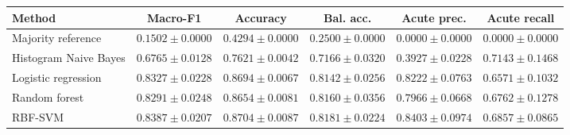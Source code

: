 \begin{tabular}{lccccc}
\toprule
Method & Macro-F1 & Accuracy & Bal. acc. & Acute prec. & Acute recall \\
\midrule
Majority reference & $0.1502 \pm 0.0000$ & $0.4294 \pm 0.0000$ & $0.2500 \pm 0.0000$ & $0.0000 \pm 0.0000$ & $0.0000 \pm 0.0000$ \\
Histogram Naive Bayes & $0.6765 \pm 0.0128$ & $0.7621 \pm 0.0042$ & $0.7166 \pm 0.0320$ & $0.3927 \pm 0.0228$ & $0.7143 \pm 0.1468$ \\
Logistic regression & $0.8327 \pm 0.0228$ & $0.8694 \pm 0.0067$ & $0.8142 \pm 0.0256$ & $0.8222 \pm 0.0763$ & $0.6571 \pm 0.1032$ \\
Random forest & $0.8291 \pm 0.0248$ & $0.8654 \pm 0.0081$ & $0.8160 \pm 0.0356$ & $0.7966 \pm 0.0668$ & $0.6762 \pm 0.1278$ \\
RBF-SVM & $0.8387 \pm 0.0207$ & $0.8704 \pm 0.0087$ & $0.8181 \pm 0.0224$ & $0.8403 \pm 0.0974$ & $0.6857 \pm 0.0865$ \\
\bottomrule
\end{tabular}

